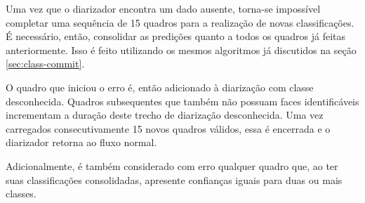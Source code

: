 Uma vez que o diarizador encontra um dado ausente, torna-se impossível completar uma sequência de 15 quadros para a realização de novas classificações.
É necessário, então, consolidar as predições quanto a todos os quadros já feitas anteriormente.
Isso é feito utilizando os mesmos algoritmos já discutidos na seção \ref{sec:class-commit}.

O quadro que iniciou o erro é, então adicionado à diarização com classe desconhecida.
Quadros subsequentes que também não possuam faces identificáveis incrementam a duração deste trecho de diarização desconhecida.
Uma vez carregados consecutivamente 15 novos quadros válidos, essa é encerrada e o diarizador retorna ao fluxo normal.

Adicionalmente, é também considerado com erro qualquer quadro que, ao ter suas classificações consolidadas, apresente confianças iguais para duas ou mais classes.